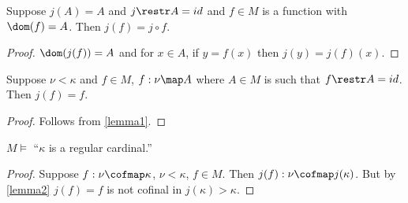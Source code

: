 \documentclass[oneside,12pt]{amsart}
\begin{document}
\begin{lemma}
\label{lemma1}
Suppose $j(A) = A$ and $j\restr A = id$ and $f\in M$ is a function with $\dom(f) = A$. Then $j(f) = j \circ f$.
\end{lemma}
\begin{proof}
$\dom(j(f)) = A$ and for  $x \in A$, if $y = f(x)$ then $j(y) = j(f)(x)$.
\end{proof}

\begin{lemma}
\label{lemma2}
Suppose $\nu<\kappa$ and $f\in M$, $f:\nu \map A$ where $A\in M$ is such that $f\restr A = id$.
Then $j(f) = f$.
\end{lemma}
\begin{proof}
Follows from \ref{lemma1}.
\end{proof}

\begin{lemma}
$M\models$ ``$\kappa$ is a regular cardinal.''
\end{lemma}
\begin{proof}
Suppose $f:\nu\cofmap\kappa$, $\nu < \kappa$, $f\in M$. Then $j(f) : \nu \cofmap j(\kappa)$.
But by \ref{lemma2} $j(f) = f$ is not cofinal in $j(\kappa) > \kappa$.
\end{proof}
\end{document}

